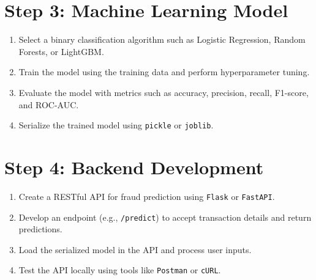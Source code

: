 \documentclass[12pt]{article}
\begin{document}
\section*{Step 3: Machine Learning Model}
\begin{enumerate}
    \item Select a binary classification algorithm such as Logistic Regression, Random Forests, or LightGBM.
    \item Train the model using the training data and perform hyperparameter tuning.
    \item Evaluate the model with metrics such as accuracy, precision, recall, F1-score, and ROC-AUC.
    \item Serialize the trained model using \texttt{pickle} or \texttt{joblib}.
\end{enumerate}

\section*{Step 4: Backend Development}
\begin{enumerate}
    \item Create a RESTful API for fraud prediction using \texttt{Flask} or \texttt{FastAPI}.
    \item Develop an endpoint (e.g., \texttt{/predict}) to accept transaction details and return predictions.
    \item Load the serialized model in the API and process user inputs.
    \item Test the API locally using tools like \texttt{Postman} or \texttt{cURL}.
\end{enumerate}
\end{document}
